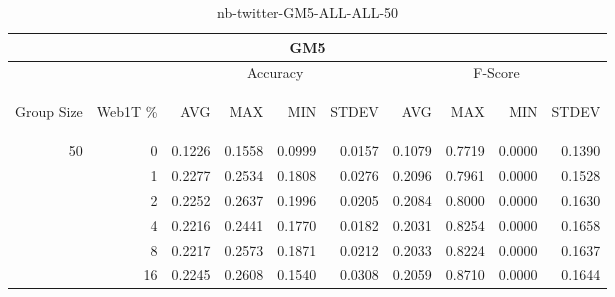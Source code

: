 \begin{center}
\begin{table}[htbp]
\begin{center}
\begin{tabular}{ | r | r | r | r | r | r | r | r | r | r |}
\hline
\multicolumn{10}{|c|}{GM5}\\
\hline
 & & \multicolumn{4}{|c|}{Accuracy} & \multicolumn{4}{|c|}{F-Score}\\ \cline{3-10}
\begin{sideways}Group Size\end{sideways} & \begin{sideways}Web1T \%\end{sideways} & \begin{sideways}AVG\end{sideways} & \begin{sideways}MAX\end{sideways} & \begin{sideways}MIN\end{sideways} & \begin{sideways}STDEV\end{sideways} & \begin{sideways}AVG\end{sideways} & \begin{sideways}MAX\end{sideways} & \begin{sideways}MIN\end{sideways} & \begin{sideways}STDEV\end{sideways}\\
\hline
\multirow{5}{*}{50}
 & 0 & 0.1226 & 0.1558 & 0.0999 & 0.0157 & 0.1079 & 0.7719 & 0.0000 & 0.1390\\ \cline{2-10}
 & 1 & 0.2277 & 0.2534 & 0.1808 & 0.0276 & 0.2096 & 0.7961 & 0.0000 & 0.1528\\ \cline{2-10}
 & 2 & 0.2252 & 0.2637 & 0.1996 & 0.0205 & 0.2084 & 0.8000 & 0.0000 & 0.1630\\ \cline{2-10}
 & 4 & 0.2216 & 0.2441 & 0.1770 & 0.0182 & 0.2031 & 0.8254 & 0.0000 & 0.1658\\ \cline{2-10}
 & 8 & 0.2217 & 0.2573 & 0.1871 & 0.0212 & 0.2033 & 0.8224 & 0.0000 & 0.1637\\ \cline{2-10}
 & 16 & 0.2245 & 0.2608 & 0.1540 & 0.0308 & 0.2059 & 0.8710 & 0.0000 & 0.1644\\ \cline{2-10}
\hline
\end{tabular}
\caption{nb-twitter-GM5-ALL-ALL-50}
\label{table:nb-twitter-GM5-ALL-ALL-50}
\end{center}
\end{table}
\end{center}

